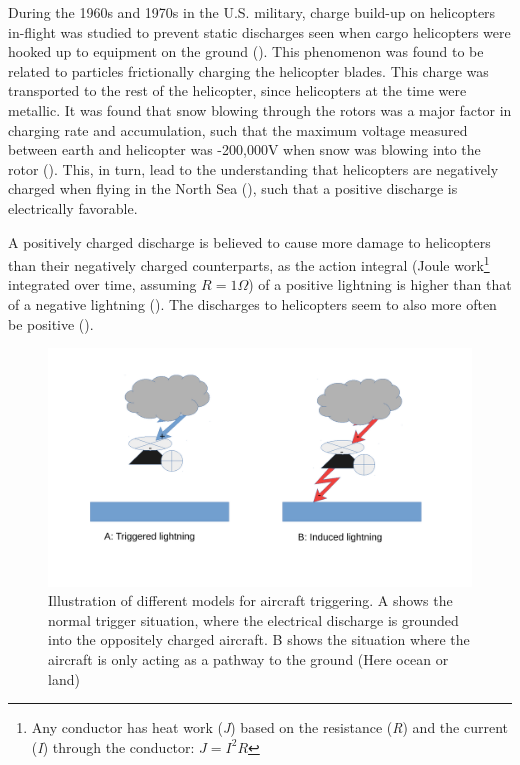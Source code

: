 During the 1960s and 1970s in the U.S. military, charge build-up on helicopters in-flight was studied to prevent static discharges seen when cargo helicopters were hooked up to equipment on the ground (\cite{ad750617}). This phenomenon was found to be related to particles frictionally charging the helicopter blades. This charge was transported to the rest of the helicopter, since helicopters at the time were metallic. It was found that snow blowing through the rotors was a major factor in charging rate and accumulation, such that the maximum voltage measured between earth and helicopter was -200,000V when snow was blowing into the rotor (\cite{ad282087}). This, in turn, lead to the understanding that helicopters are negatively charged when flying in the North Sea (\cite{wilkinson2013}), such that a positive discharge is electrically favorable.

A positively charged discharge is believed to cause more damage to helicopters than their negatively charged counterparts, as the action integral (Joule work\footnote{Any conductor has heat work (\textit{J}) based on the resistance (\textit{R}) and the current (\textit{I}) through the conductor: $J = I^2 R$} integrated over time, assuming $R = 1 \Omega$) of a positive lightning is higher than that of a negative lightning (\cite{hardwick1999}). The discharges to helicopters seem to also more often be positive (\cite{hardwick1999}).

\begin{figure}
    \centering
    \includegraphics[width=\textwidth]{Figures/triggertyper.pdf}
    \caption{Illustration of different models for aircraft triggering. A shows the normal trigger situation, where the electrical discharge is grounded into the oppositely charged aircraft. B shows the situation where the aircraft is only acting as a pathway to the ground (Here ocean or land)}
    \label{fig:triggertyper}
\end{figure}

